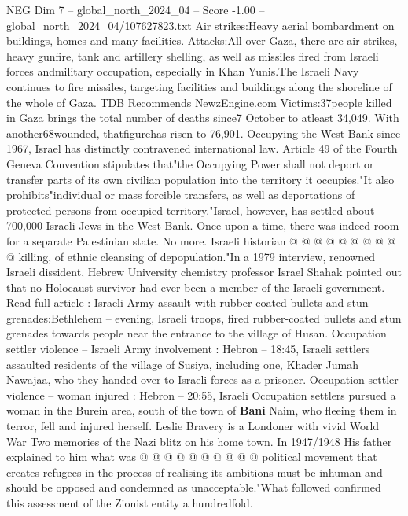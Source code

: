 \begin{textsample}{NEG Dim 7 – global\_north\_2024\_04 – Score -1.00 – global\_north\_2024\_04/107627823.txt}  \label{ex:f7_neg_387}
Air strikes:Heavy aerial bombardment on buildings, homes and many facilities.
Attacks:All over Gaza, there are air strikes, heavy gunfire, tank and artillery shelling, as well as missiles fired from Israeli forces andmilitary occupation, especially in Khan Yunis.The Israeli Navy continues to fire missiles, targeting facilities and buildings along the shoreline of the whole of Gaza.
TDB Recommends NewzEngine.com Victims:37people killed in Gaza brings the total number of deaths since7 October to atleast 34,049.
With another68wounded, thatfigurehas risen to 76,901.
Occupying the West Bank since 1967, Israel has distinctly contravened international law.
Article 49 of the Fourth Geneva Convention stipulates that"the Occupying Power shall not deport or transfer parts of its own civilian population into the territory it occupies."It also prohibits"individual or mass forcible transfers, as well as deportations of protected persons from occupied territory."Israel, however, has settled about 700,000 Israeli Jews in the West Bank.
Once upon a time, there was indeed room for a separate Palestinian state.
No more.
Israeli historian @ @ @ @ @ @ @ @ @ @ killing, of ethnic cleansing of depopulation."In a 1979 interview, renowned Israeli dissident, Hebrew University chemistry professor Israel Shahak pointed out that no Holocaust survivor had ever been a member of the Israeli government.
Read full article : Israeli Army assault with rubber-coated bullets and stun grenades:Bethlehem -- evening, Israeli troops, fired rubber-coated bullets and stun grenades towards people near the entrance to the village of Husan.
Occupation settler violence -- Israeli Army involvement : Hebron -- 18:45, Israeli settlers assaulted residents of the village of Susiya, including one, Khader Jumah Nawajaa, who they handed over to Israeli forces as a prisoner.
Occupation settler violence -- woman injured : Hebron -- 20:55, Israeli Occupation settlers pursued a woman in the Burein area, south of the town of \textbf{Bani} Naim, who fleeing them in terror, fell and injured herself.
Leslie Bravery is a Londoner with vivid World War Two memories of the Nazi blitz on his home town.
In 1947/1948 His father explained to him what was @ @ @ @ @ @ @ @ @ @ political movement that creates refugees in the process of realising its ambitions must be inhuman and should be opposed and condemned as unacceptable."What followed confirmed this assessment of the Zionist entity a hundredfold.

\end{textsample}

